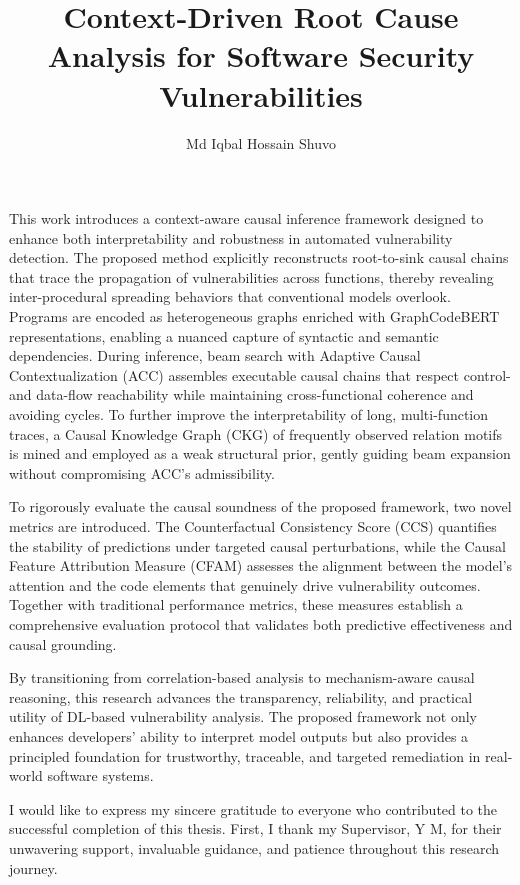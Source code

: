 \documentclass{buthesis}
\begin{document}
\title{Context-Driven Root Cause Analysis for Software Security Vulnerabilities}
\author{Md Iqbal Hossain Shuvo}

\beforepreface
{}

This work introduces a context-aware causal inference framework designed to enhance both interpretability and robustness in automated vulnerability detection. The proposed method explicitly reconstructs root-to-sink causal chains that trace the propagation of vulnerabilities across functions, thereby revealing inter-procedural spreading behaviors that conventional models overlook. Programs are encoded as heterogeneous graphs enriched with GraphCodeBERT representations, enabling a nuanced capture of syntactic and semantic dependencies. During inference, beam search with Adaptive Causal Contextualization (ACC) assembles executable causal chains that respect control- and data-flow reachability while maintaining cross-functional coherence and avoiding cycles. To further improve the interpretability of long, multi-function traces, a Causal Knowledge Graph (CKG) of frequently observed relation motifs is mined and employed as a weak structural prior, gently guiding beam expansion without compromising ACC’s admissibility.

To rigorously evaluate the causal soundness of the proposed framework, two novel metrics are introduced. The Counterfactual Consistency Score (CCS) quantifies the stability of predictions under targeted causal perturbations, while the Causal Feature Attribution Measure (CFAM) assesses the alignment between the model’s attention and the code elements that genuinely drive vulnerability outcomes. Together with traditional performance metrics, these measures establish a comprehensive evaluation protocol that validates both predictive effectiveness and causal grounding.

By transitioning from correlation-based analysis to mechanism-aware causal reasoning, this research advances the transparency, reliability, and practical utility of DL-based vulnerability analysis. The proposed framework not only enhances developers’ ability to interpret model outputs but also provides a principled foundation for trustworthy, traceable, and targeted remediation in real-world software systems.


I would like to express my sincere gratitude to everyone who contributed to the successful completion of this thesis. First, I thank my Supervisor, Y M, for their unwavering support, invaluable guidance, and patience throughout this research journey.
\end{document}
